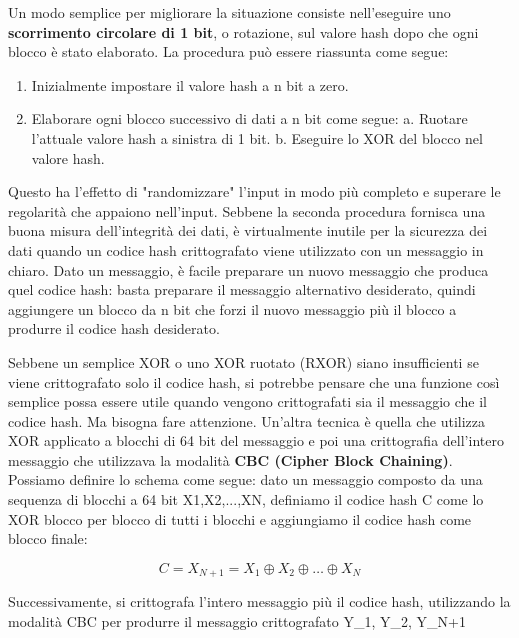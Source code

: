 \documentclass{article}
\begin{document}
\vspace{0.8cm}

Un modo semplice per migliorare la situazione consiste nell'eseguire uno \textbf{scorrimento circolare di 1 bit}, o rotazione, sul valore hash dopo che ogni blocco è stato elaborato. La procedura può essere riassunta come segue:

\begin{enumerate}
    \item Inizialmente impostare il valore hash a n bit a zero.
    \item Elaborare ogni blocco successivo di dati a n bit come segue: a. Ruotare l'attuale valore hash a sinistra di 1 bit. b. Eseguire lo XOR del blocco nel valore hash.
\end{enumerate}

Questo ha l'effetto di "randomizzare" l'input in modo più completo e superare le regolarità che appaiono nell'input. Sebbene la seconda procedura fornisca una buona misura dell'integrità dei dati, è virtualmente inutile per la sicurezza dei dati quando un codice hash crittografato viene utilizzato con un messaggio in chiaro. Dato un messaggio, è facile preparare un nuovo messaggio che produca quel codice hash: basta preparare il messaggio alternativo desiderato, quindi aggiungere un blocco da n bit che forzi il nuovo messaggio più il blocco a produrre il codice hash desiderato.

Sebbene un semplice XOR o uno XOR ruotato (RXOR) siano insufficienti se viene crittografato solo il codice hash, si potrebbe pensare che una funzione così semplice possa essere utile quando vengono crittografati sia il messaggio che il codice hash. Ma bisogna fare attenzione. Un'altra tecnica è quella che utilizza XOR applicato a blocchi di 64 bit del messaggio e poi una crittografia dell'intero messaggio che utilizzava la modalità \textbf{CBC (Cipher Block Chaining)}. Possiamo definire lo schema come segue: dato un messaggio composto da una sequenza di blocchi a 64 bit X1,X2,...,XN, definiamo il codice hash C come lo XOR blocco per blocco di tutti i blocchi e aggiungiamo il codice hash come blocco finale:

\begin{equation*}
    C = X_{N+1} = X_1 \oplus X_2 \oplus \dots \oplus X_N
\end{equation*}

Successivamente, si crittografa l'intero messaggio più il codice hash, utilizzando la modalità CBC per produrre il messaggio crittografato Y\_1, Y\_2, Y\_N+1
\end{document}
